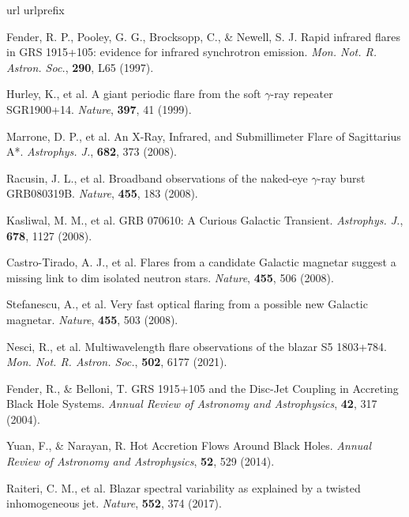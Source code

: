 \documentclass{nature_plusfigure}
\newcommand{\mn}{{Mon. Not. R. Astron. Soc.}}
\newcommand{\mnras}{\mn}
\newcommand{\apj}{{Astrophys. J.}}
\newcommand{\nat}{{Nature}}
\newcommand{\araa}{Annual Review of Astronomy and Astrophysics}
\begin{document}
\begin{thebibliography}{100}
\expandafter\ifx\csname url\endcsname\relax
  \def\url#1{\texttt{#1}}\fi
\expandafter\ifx\csname urlprefix\endcsname\relax\def\urlprefix{URL }\fi
\providecommand{\bibinfo}[2]{#2}
\providecommand{\eprint}[2][]{\url{#2}}



 Fender, R. P., Pooley, G. G., Brocksopp, C., \& Newell, S. J. Rapid infrared flares in GRS 1915+105: evidence for infrared synchrotron emission. \emph{\mnras}, \textbf{290}, L65 (1997). 

 Hurley, K., et al. A giant periodic flare from the soft $\gamma$-ray repeater SGR1900+14. \emph{\nat}, \textbf{397}, 41 (1999). 

 Marrone, D. P., et al. An X-Ray, Infrared, and Submillimeter Flare of Sagittarius A*. \emph{\apj}, \textbf{682}, 373 (2008). 

 Racusin, J. L., et al. Broadband observations of the naked-eye $\gamma$-ray burst GRB080319B. \emph{\nat}, \textbf{455}, 183 (2008). 

 Kasliwal, M. M., et al. GRB 070610: A Curious Galactic Transient. \emph{\apj}, \textbf{678}, 1127 (2008). 

 Castro-Tirado, A. J., et al. Flares from a candidate Galactic magnetar suggest a missing link to dim isolated neutron stars. \emph{\nat}, \textbf{455}, 506 (2008). 

 Stefanescu, A., et al. Very fast optical flaring from a possible new Galactic magnetar. \emph{\nat}, \textbf{455}, 503 (2008). 

 Nesci, R., et al. Multiwavelength flare observations of the blazar S5 1803+784. \emph{\mnras}, \textbf{502}, 6177 (2021). 

 Fender, R., \& Belloni, T. GRS 1915+105 and the Disc-Jet Coupling in Accreting Black Hole Systems. \emph{\araa}, \textbf{42}, 317 (2004). 

 Yuan, F., \& Narayan, R. Hot Accretion Flows Around Black Holes. \emph{\araa}, \textbf{52}, 529 (2014). 

 Raiteri, C. M., et al. Blazar spectral variability as explained by a twisted inhomogeneous jet. \emph{\nat}, \textbf{552}, 374 (2017). 


\end{thebibliography}
\end{document}
